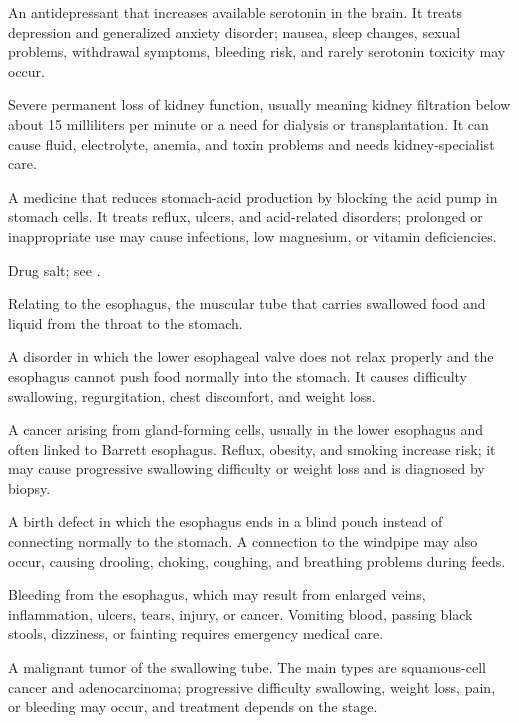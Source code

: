  An antidepressant that increases available serotonin in the brain. It treats depression and generalized anxiety disorder; nausea, sleep changes, sexual problems, withdrawal symptoms, bleeding risk, and rarely serotonin toxicity may occur.

 Severe permanent loss of kidney function, usually meaning kidney filtration below about 15 milliliters per minute or a need for dialysis or transplantation. It can cause fluid, electrolyte, anemia, and toxin problems and needs kidney-specialist care.

 A medicine that reduces stomach-acid production by blocking the acid pump in stomach cells. It treats reflux, ulcers, and acid-related disorders; prolonged or inappropriate use may cause infections, low magnesium, or vitamin deficiencies.

 Drug salt; see .

 Relating to the esophagus, the muscular tube that carries swallowed food and liquid from the throat to the stomach.

 A disorder in which the lower esophageal valve does not relax properly and the esophagus cannot push food normally into the stomach. It causes difficulty swallowing, regurgitation, chest discomfort, and weight loss.

 A cancer arising from gland-forming cells, usually in the lower esophagus and often linked to Barrett esophagus. Reflux, obesity, and smoking increase risk; it may cause progressive swallowing difficulty or weight loss and is diagnosed by biopsy.

 A birth defect in which the esophagus ends in a blind pouch instead of connecting normally to the stomach. A connection to the windpipe may also occur, causing drooling, choking, coughing, and breathing problems during feeds.

 Bleeding from the esophagus, which may result from enlarged veins, inflammation, ulcers, tears, injury, or cancer. Vomiting blood, passing black stools, dizziness, or fainting requires emergency medical care.

 A malignant tumor of the swallowing tube. The main types are squamous-cell cancer and adenocarcinoma; progressive difficulty swallowing, weight loss, pain, or bleeding may occur, and treatment depends on the stage.

